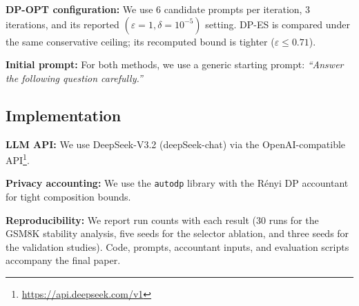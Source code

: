 \noindent \textbf{DP-OPT configuration:} We use 6 candidate prompts per iteration, 3 iterations, and its reported $(\varepsilon{=}1,\delta{=}10^{-5})$ setting. DP-ES is compared under the same conservative ceiling; its recomputed bound is tighter ($\varepsilon\leq0.71$).

\noindent \textbf{Initial prompt:} For both methods, we use a generic starting prompt: \textit{``Answer the following question carefully.''}





\subsection{Implementation}

\textbf{LLM API:} We use DeepSeek-V3.2 (deepSeek-chat) via the OpenAI-compatible API\footnote{\url{https://api.deepseek.com/v1}}.
    
\noindent \textbf{Privacy accounting:} We use the \texttt{autodp} library \cite{autodp} with the R\'enyi DP accountant for tight composition bounds.

\noindent \textbf{Reproducibility:} We report run counts with each result (30 runs for the GSM8K stability analysis, five seeds for the selector ablation, and three seeds for the validation studies). Code, prompts, accountant inputs, and evaluation scripts accompany the final paper.


